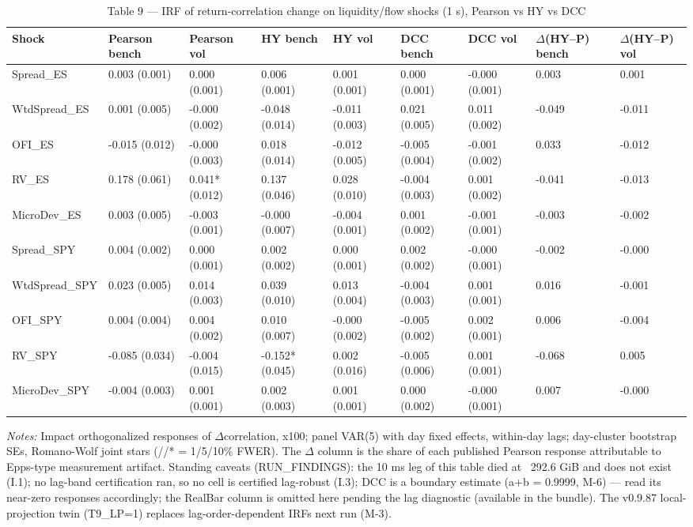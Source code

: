\begin{table}[htbp]\centering
\caption{Table 9 — IRF of return-correlation change on liquidity/flow shocks (1 s), Pearson vs HY vs DCC}
\label{tab:t9}
\small
\begin{tabular}{lllllllll}
\toprule
Shock & Pearson bench & Pearson vol & HY bench & HY vol & DCC bench & DCC vol & $\Delta$(HY--P) bench & $\Delta$(HY--P) vol \\
\midrule
Spread\_ES & 0.003 (0.001) & 0.000 (0.001) & 0.006\sym{**} (0.001) & 0.001 (0.001) & 0.000 (0.001) & -0.000 (0.001) & 0.003 & 0.001 \\
WtdSpread\_ES & 0.001 (0.005) & -0.000 (0.002) & -0.048\sym{**} (0.014) & -0.011\sym{**} (0.003) & 0.021\sym{\sym{**}*} (0.005) & 0.011\sym{\sym{**}*} (0.002) & -0.049 & -0.011 \\
OFI\_ES & -0.015 (0.012) & -0.000 (0.003) & 0.018 (0.014) & -0.012 (0.005) & -0.005 (0.004) & -0.001 (0.002) & 0.033 & -0.012 \\
RV\_ES & 0.178 (0.061) & 0.041* (0.012) & 0.137 (0.046) & 0.028 (0.010) & -0.004 (0.003) & 0.001 (0.002) & -0.041 & -0.013 \\
MicroDev\_ES & 0.003 (0.005) & -0.003 (0.001) & -0.000 (0.007) & -0.004 (0.001) & 0.001 (0.002) & -0.001 (0.001) & -0.003 & -0.002 \\
Spread\_SPY & 0.004 (0.002) & 0.000 (0.001) & 0.002 (0.002) & 0.000 (0.001) & 0.002 (0.002) & -0.000 (0.001) & -0.002 & -0.000 \\
WtdSpread\_SPY & 0.023\sym{**} (0.005) & 0.014\sym{**} (0.003) & 0.039\sym{**} (0.010) & 0.013 (0.004) & -0.004 (0.003) & 0.001 (0.001) & 0.016 & -0.001 \\
OFI\_SPY & 0.004 (0.004) & 0.004 (0.002) & 0.010 (0.007) & -0.000 (0.002) & -0.005 (0.002) & 0.002 (0.001) & 0.006 & -0.004 \\
RV\_SPY & -0.085 (0.034) & -0.004 (0.015) & -0.152* (0.045) & 0.002 (0.016) & -0.005 (0.006) & 0.001 (0.001) & -0.068 & 0.005 \\
MicroDev\_SPY & -0.004 (0.003) & 0.001 (0.001) & 0.002 (0.003) & 0.001 (0.001) & 0.000 (0.002) & -0.000 (0.001) & 0.007 & -0.000 \\
\bottomrule
\end{tabular}
\begin{minipage}{\linewidth}\vspace{2pt}\footnotesize\emph{Notes:} Impact orthogonalized responses of $\Delta$correlation, x100; panel VAR(5) with day fixed effects, within-day lags; day-cluster bootstrap SEs, Romano-Wolf joint stars (\sym{\sym{**}*}/\sym{**}/* = 1/5/10\% FWER). The $\Delta$ column is the share of each published Pearson response attributable to Epps-type measurement artifact. Standing caveats (RUN\_FINDINGS): the 10 ms leg of this table died at ~292.6 GiB and does not exist (I.1); no lag-band certification ran, so no cell is certified lag-robust (I.3); DCC is a boundary estimate (a+b = 0.9999, M-6) — read its near-zero responses accordingly; the RealBar column is omitted here pending the lag diagnostic (available in the bundle). The v0.9.87 local-projection twin (T9\_LP=1) replaces lag-order-dependent IRFs next run (M-3).\end{minipage}
\end{table}

